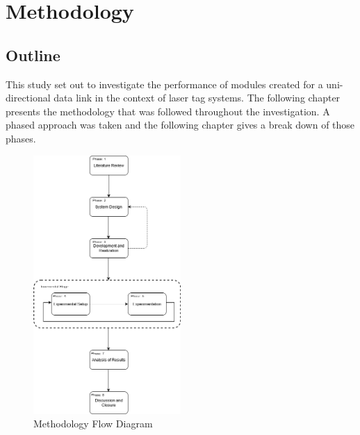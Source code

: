 \chapter{Methodology}
\label{ch_methodology}






\section{Outline}

This study set out to investigate the performance of modules created for a uni-directional data link in the context of laser tag systems. The following chapter presents the methodology that was followed throughout the investigation. A phased approach was taken and the following chapter gives a break down of those phases.

\begin{figure}[H]
	\centering
	\includegraphics[width=0.5\textwidth]{figures/methodology/methodology}
	\caption{Methodology Flow Diagram}
	\label{fig:methodology_overview}
\end{figure}

